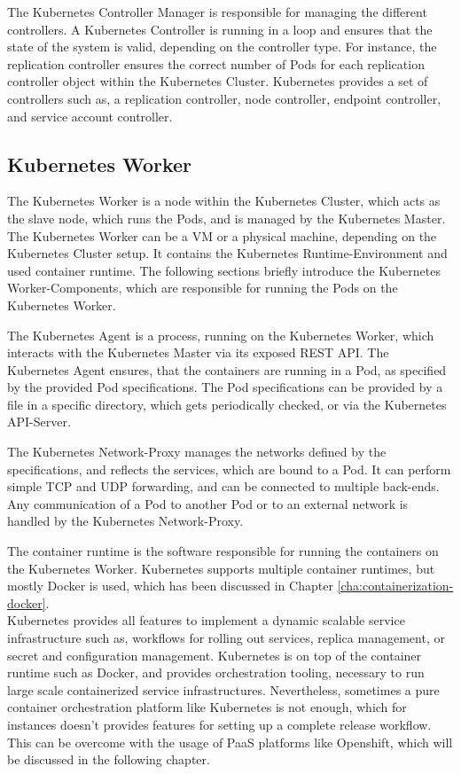 The Kubernetes Controller Manager is responsible for managing the different controllers. A Kubernetes Controller is running in a loop and ensures that the state of the system is valid, depending on the controller type. For instance, the replication controller ensures the correct number of Pods for each replication controller object within the Kubernetes Cluster. Kubernetes provides a set of controllers such as, a replication controller, node controller, endpoint controller, and service account controller.

\subsection{Kubernetes Worker}
\label{sec:caas-kubernetes-worker}
The Kubernetes Worker is a node within the Kubernetes Cluster, which acts as the slave node, which runs the Pods, and is managed by the Kubernetes Master. The Kubernetes Worker can be a VM or a physical machine, depending on the Kubernetes Cluster setup. It contains the Kubernetes Runtime-Environment and used container runtime. The following sections briefly introduce the Kubernetes Worker-Components, which are responsible for running the Pods on the Kubernetes Worker\cite{CNCFKubernetesComponents2018}. 

The Kubernetes Agent is a process, running on the Kubernetes Worker, which interacts with the Kubernetes Master via its exposed REST API. The Kubernetes Agent ensures, that the containers are running in a Pod, as specified by the provided Pod specifications. The Pod specifications can be provided by a file in a specific directory, which gets periodically checked, or via the Kubernetes API-Server.

The Kubernetes Network-Proxy manages the networks defined by the specifications, and reflects the services, which are bound to a Pod. It can perform simple TCP and UDP forwarding, and can be connected to multiple back-ends. Any communication of a Pod to another Pod or to an external network is handled by the Kubernetes Network-Proxy. 

The container runtime is the software responsible for running the containers on the Kubernetes Worker. Kubernetes supports multiple container runtimes, but mostly  Docker is used, which has been discussed in Chapter \vref{cha:containerization-docker}. \\

Kubernetes provides all features to implement a dynamic scalable service infrastructure such as, workflows for rolling out services, replica management, or secret and configuration management. Kubernetes is on top of the container runtime such as Docker, and provides orchestration tooling, necessary to run large scale containerized service infrastructures. Nevertheless, sometimes a pure container orchestration platform like Kubernetes is not enough, which for instances doesn't provides features for setting up a complete release workflow. This can be overcome with the usage of PaaS platforms like Openshift, which will be discussed in the following chapter.
